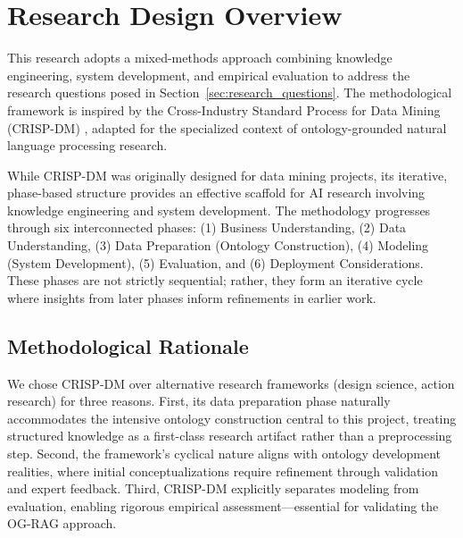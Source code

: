 \label{chap:methodology}

\section{Research Design Overview}
\label{sec:research_design}

This research adopts a mixed-methods approach combining knowledge engineering, system development, and empirical evaluation to address the research questions posed in Section~\ref{sec:research_questions}. The methodological framework is inspired by the Cross-Industry Standard Process for Data Mining (CRISP-DM) \cite{wirth2000crisp}, adapted for the specialized context of ontology-grounded natural language processing research.

While CRISP-DM was originally designed for data mining projects, its iterative, phase-based structure provides an effective scaffold for AI research involving knowledge engineering and system development. The methodology progresses through six interconnected phases: (1) Business Understanding, (2) Data Understanding, (3) Data Preparation (Ontology Construction), (4) Modeling (System Development), (5) Evaluation, and (6) Deployment Considerations. These phases are not strictly sequential; rather, they form an iterative cycle where insights from later phases inform refinements in earlier work.

\subsection{Methodological Rationale}
\label{subsec:method_rationale}

We chose CRISP-DM over alternative research frameworks (design science, action research) for three reasons. First, its data preparation phase naturally accommodates the intensive ontology construction central to this project, treating structured knowledge as a first-class research artifact rather than a preprocessing step. Second, the framework's cyclical nature aligns with ontology development realities, where initial conceptualizations require refinement through validation and expert feedback. Third, CRISP-DM explicitly separates modeling from evaluation, enabling rigorous empirical assessment—essential for validating the OG-RAG approach.

